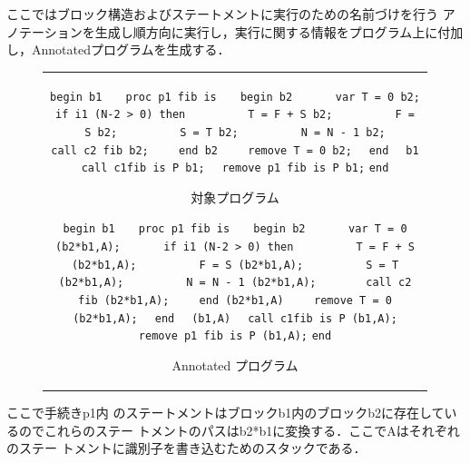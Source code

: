 \documentclass[submit,PRO]{ipsj}
\def\|{\verb|}
\begin{document}
%\subsection{Annotatedプログラム}

ここではブロック構造およびステートメントに実行のための名前づけを行う
アノテーションを生成し順方向に実行し，実行に関する情報をプログラム上に付加
し，Annotatedプログラムを生成する．

\begin{figure}[tb]
\begin{center}
\begin{tabular}{c}
\begin{minipage}[t]{0.5\columnwidth}
\footnotesize
\setbox0\vbox{
\hbox{\|begin b1|}
\hbox{\|   proc p1 fib is|}
\hbox{\|   begin b2|}
\hbox{\|      var T = 0 b2;|}
\hbox{\|      if i1 (N-2 > 0) then|}
\hbox{\|         T = F + S b2;|}
\hbox{\|         F = S b2;|}
\hbox{\|         S = T b2;|}
\hbox{\|         N = N - 1 b2;|}
\hbox{\|       call c2 fib b2;|}
\hbox{\|    end b2|}
\hbox{\|    remove T = 0 b2;|}
\hbox{\|  end|}
\hbox{\|  b1|}
\hbox{\|  call c1fib is P b1;|}
\hbox{\|  remove p1 fib is P b1;|}
\hbox{\|end|}
}
\centerline{\fbox{\box0}}
\caption{対象プログラム}
\ecaption{Original Program}
\label{fig:Horiginal}
\end{minipage}

\begin{minipage}[t]{0.5\columnwidth}
\footnotesize
\setbox0\vbox{
\hbox{\|begin b1|}
\hbox{\|   proc p1 fib is|}
\hbox{\|   begin b2|}
\hbox{\|      var T = 0 (b2*b1,A);|}
\hbox{\|      if i1 (N-2 > 0) then|}
\hbox{\|         T = F + S (b2*b1,A);|}
\hbox{\|         F = S (b2*b1,A);|}
\hbox{\|         S = T (b2*b1,A);|}
\hbox{\|         N = N - 1 (b2*b1,A);|}
\hbox{\|       call c2 fib (b2*b1,A);|}
\hbox{\|    end (b2*b1,A)|}
\hbox{\|    remove T = 0 (b2*b1,A);|}
\hbox{\|  end|}
\hbox{\|  (b1,A)|}
\hbox{\|  call c1fib is P (b1,A);|}
\hbox{\|  remove p1 fib is P (b1,A);|}
\hbox{\|end|}
}
\centerline{\fbox{\box0}}
\caption{Annotated プログラム}
\ecaption{Annotated Program}
\label{fig:Hannotated}
\end{minipage}
\end{tabular}
\end{center}
\end{figure}

ここで手続きp1内
のステートメントはブロックb1内のブロックb2に存在しているのでこれらのステー
トメントのパスはb2*b1に変換する．ここでAはそれぞれのステー
トメントに識別子を書き込むためのスタックである．
\end{document}
